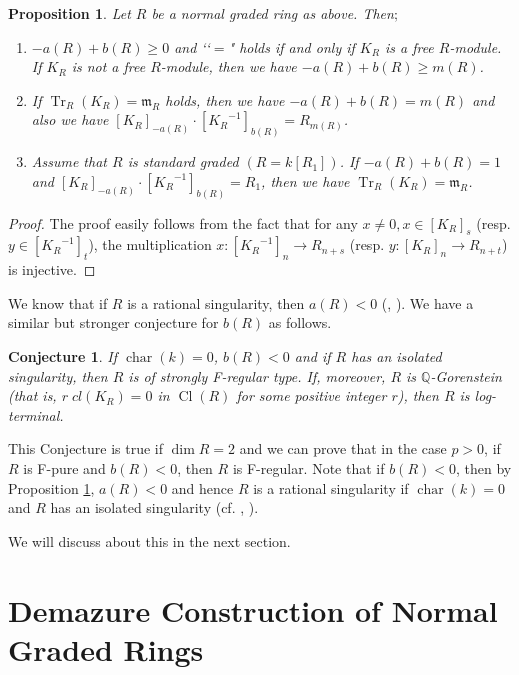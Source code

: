\documentclass[12pt]{amsart}
\newtheorem{prop}[thm]{Proposition}
\newtheorem{conj}[thm]{Conjecture}
\theoremstyle{definition}
\theoremstyle{remark}
\numberwithin{equation}{section}
\DeclareMathOperator{\Tr}{Tr}
\DeclareMathOperator{\chr}{char}
\DeclareMathOperator{\Cl}{Cl}
\newcommand{\m}{\mathfrak m}
\newcommand{\KiR}{{K_R}^{-1}}
\newcommand{\Q}{\mathbb Q}
\renewcommand{\:}{\colon}
\begin{document}
\begin{prop}\label{a(R)b(R)} 
Let $R$ be a normal graded ring as above. Then$;$  
\begin{enumerate}
\item $-a(R)+b(R) \ge 0$ and \lq\lq $=$" holds if and only if 
$K_R$ is a {\em free} $R$-module. 
If $K_R$ is not a free $R$-module, then 
we have $-a(R) + b(R) \ge m(R)$. 
\item If $\Tr_R(K_R)=\m_R$ holds, then we have $-a(R) + b(R) = m(R)$ and 
also we have $[K_R]_{-a(R)}\cdot [\KiR]_{b(R)} =  R_{m(R)}$. 
\item Assume that $R$ is standard graded $(R = k[R_1])$. 
If $-a(R)+b(R)=1$ and 
$[K_R]_{-a(R)}\cdot [\KiR]_{b(R)} =  R_1$, then we have 
$\Tr_R(K_R)= \m_R$. 
\end{enumerate}
\end{prop}

\begin{proof}  
The proof easily follows from the fact that for any $x\ne 0, x \in [K_R]_s$
(resp. $y\in [\KiR]_t$), the multiplication $x : [\KiR]_n \to R_{n+s}$ 
(resp. $y : [K_R]_n \to R_{n+t}$) is injective.  
\end{proof}

We know that if $R$ is a rational singularity, then $a(R)< 0$ (\cite{Fl}, \cite{W1}). 
We have a similar but stronger conjecture for $b(R)$ as follows.

\begin{conj}\label{b(R)<0} If $\chr(k) = 0$,  
$b(R)< 0$ and if $R$ has an isolated singularity, 
then $R$ is of strongly F-regular type.  
If, moreover,  $R$ is $\Q$-Gorenstein (that is, $r\; cl(K_R) = 0$ in $\Cl(R)$ 
for some positive integer $r$), then $R$ is log-terminal.
\end{conj}

\par 
This Conjecture is true if $\dim R=2$ and we can prove that 
in the case $p>0$, 
if $R$ is F-pure and $b(R)<0$, then $R$ is F-regular. Note that if 
$b(R)<0$, then by Proposition \ref{a(R)b(R)}, $a(R)<0$ 
and hence $R$ is a rational singularity 
if $\chr(k)=0$ and $R$ has an isolated singularity (cf. \cite{Fl}, \cite{W1}).  

\par 
We will discuss about this  in the next section. 

\section{Demazure Construction of Normal Graded Rings}  
\label{s:Demazure}
\end{document}
